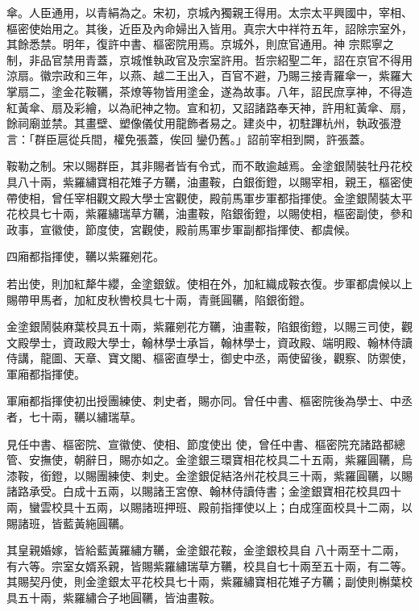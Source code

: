 \begin{pinyinscope}
 傘。人臣通用，以青絹為之。宋初，京城內獨親王得用。太宗太平興國中，宰相、樞密使始用之。其後，近臣及內命婦出入皆用。真宗大中祥符五年，詔除宗室外，其餘悉禁。明年，復許中書、樞密院用焉。京城外，則庶官通用。神
 宗熙寧之制，非品官禁用青蓋，京城惟執政官及宗室許用。哲宗紹聖二年，詔在京官不得用涼扇。徽宗政和三年，以燕、越二王出入，百官不避，乃賜三接青羅傘一，紫羅大掌扇二，塗金花鞍韉，茶燎等物皆用塗金，遂為故事。八年，詔民庶享神，不得造紅黃傘、扇及彩繪，以為祀神之物。宣和初，又詔諸路奉天神，許用紅黃傘、扇，餘祠廟並禁。其畫壁、塑像儀仗用龍飾者易之。建炎中，初駐蹕杭州，執政張澄言：「群臣扈從兵間，權免張蓋，俟回
 鑾仍舊。」詔前宰相到闕，許張蓋。



 鞍勒之制。宋以賜群臣，其非賜者皆有令式，而不敢逾越焉。金塗銀鬧裝牡丹花校具八十兩，紫羅繡寶相花雉子方韉，油畫鞍，白銀銜鐙，以賜宰相，親王，樞密使帶使相，曾任宰相觀文殿大學士宮觀使，殿前馬軍步軍都指揮使。金塗銀鬧裝太平花校具七十兩，紫羅繡瑞草方韉，油畫鞍，陷銀銜鐙，以賜使相，樞密副使，參和政事，宣徽使，節度使，宮觀使，殿前馬軍步軍副都指揮使、都虞候。



 四廂都指揮使，韉以紫羅剜花。



 若出使，則加紅犛牛纓，金塗銀鈸。使相在外，加紅織成鞍衣復。步軍都虞候以上賜帶甲馬者，加紅皮秋轡校具七十兩，青氈圓韉，陷銀銜鐙。



 金塗銀鬧裝麻葉校具五十兩，紫羅剜花方韉，油畫鞍，陷銀銜鐙，以賜三司使，觀文殿學士，資政殿大學士，翰林學士承旨，翰林學士，資政殿、端明殿、翰林侍讀侍講，龍圖、天章、寶文閣、樞密直學士，御史中丞，兩使留後，觀察、防禦使，軍廂都指揮使。



 軍廂都指揮使初出授團練使、刺史者，賜亦同。曾任中書、樞密院後為學士、中丞者，七十兩，韉以繡瑞草。



 見任中書、樞密院、宣徽使、使相、節度使出
 使，曾任中書、樞密院充諸路都總管、安撫使，朝辭日，賜亦如之。金塗銀三環寶相花校具二十五兩，紫羅圓韉，烏漆鞍，銜鐙，以賜團練使、刺史。金塗銀促結洛州花校具三十兩，紫羅圓韉，以賜諸路承受。白成十五兩，以賜諸王宮僚、翰林侍讀侍書；金塗銀寶相花校具四十兩，蠻雲校具十五兩，以賜諸班押班、殿前指揮使以上；白成窪面校具十二兩，以賜諸班，皆藍黃絁圓韉。



 其皇親婚嫁，皆給藍黃羅繡方韉，金塗銀花鞍，金塗銀校具自
 八十兩至十二兩，有六等。宗室女婿系親，皆賜紫羅繡瑞草方韉，校具自七十兩至五十兩，有二等。其賜契丹使，則金塗銀太平花校具七十兩，紫羅繡寶相花雉子方韉；副使則槲葉校具五十兩，紫羅繡合子地圓韉，皆油畫鞍。




\end{pinyinscope}
